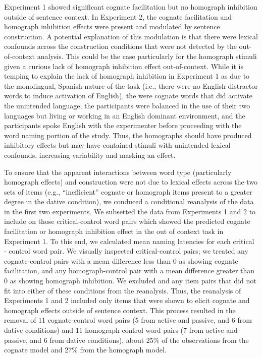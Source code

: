 Experiment 1 showed significant cognate facilitation but no homograph inhibition outside of sentence context. In Experiment 2, the cognate facilitation and homograph inhibition effects were present and modulated by sentence construction. A potential explanation of this modulation is that there were lexical confounds across the construction conditions that were not detected by the out-of-context analysis. This could be the case particularly for the homograph stimuli given a curious lack of homograph inhibition effect out-of-context. While it is temping to explain the lack of homograph inhibition in Experiment 1 as due to the monolingual, Spanish nature of the task (i.e., there were no English distractor words to induce activation of English), the were cognate words that did activate the unintended language, the participants were balanced in the use of their two languages but living or working in an English dominant environment, and the participants spoke English with the experimenter before proceeding with the word naming portion of the study. Thus, the homographs should have produced inhibitory effects but may have contained stimuli with unintended lexical confounds, increasing variability and masking an effect.

To ensure that the apparent interactions between word type (particularly homograph effects) and construction were not due to lexical effects across the two sets of items (e.g., ``inefficient'' cognate or homograph items present to a greater degree in the dative condition), we conduced a conditional reanalysis of the data in the first two experiments. We subsetted the data from Experiments 1 and 2 to include on those critical-control word pairs which showed the predicted cognate facilitation or homograph inhibition effect in the out of context task in Experiment 1. To this end, we calculated mean naming latencies for each critical - control word pair. We visually inspected critical-control pairs; we treated any cognate-control pairs with a mean difference less than 0 as showing cognate facilitation, and any homograph-control pair with a mean difference greater than 0 as showing homograph inhibition. We excluded and any item pairs that did not fit into either of these conditions from the reanalysis. Thus, the reanalysis of Experiments 1 and 2 included only items that were shown to elicit cognate and homograph effects outside of sentence context. This process resulted in the removal of 11 cognate-control word pairs (5 from active and passive, and 6 from dative conditions) and 11 homograph-control word pairs (7 from active and passive, and 6 from dative conditions), about 25\% of the observations from the cognate model and 27\% from the homograph model. 

